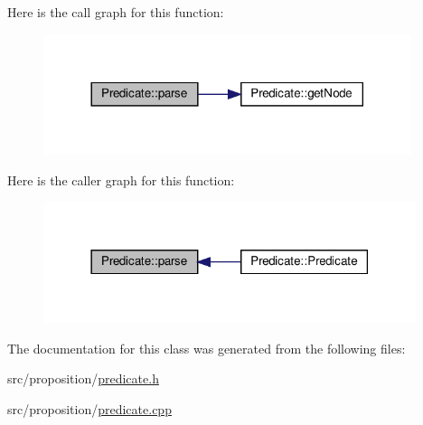 Here is the call graph for this function\+:\nopagebreak
\begin{figure}[H]
\begin{center}
\leavevmode
\includegraphics[width=305pt]{d5/d30/class_predicate_a5c43d5efe67d0fdeae29ec38267e5acb_cgraph}
\end{center}
\end{figure}
Here is the caller graph for this function\+:\nopagebreak
\begin{figure}[H]
\begin{center}
\leavevmode
\includegraphics[width=309pt]{d5/d30/class_predicate_a5c43d5efe67d0fdeae29ec38267e5acb_icgraph}
\end{center}
\end{figure}


The documentation for this class was generated from the following files\+:\begin{DoxyCompactItemize}
\item 
src/proposition/\hyperlink{predicate_8h}{predicate.\+h}\item 
src/proposition/\hyperlink{predicate_8cpp}{predicate.\+cpp}\end{DoxyCompactItemize}
